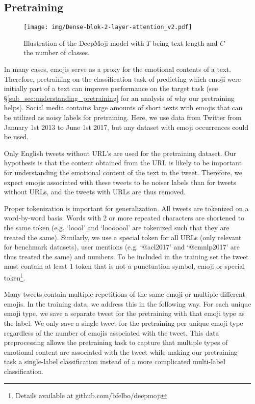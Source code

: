 \documentclass[11pt,a4paper]{article}
\begin{document}
\subsection{Pretraining}
\label{sub_sec:pretraining}

\begin{figure}[tp]
  \centering
  \texttt{[image: img/Dense-blok-2-layer-attention\_v2.pdf]}
  \caption{Illustration of the DeepMoji model with $T$ being text length and $C$ the number of classes.}
  \label{fig:lstm}
\end{figure}

In many cases, emojis serve as a proxy for the emotional contents of a text. Therefore, pretraining on the classification task of predicting which emoji were initially part of a text can improve performance on the target task (see \S\ref{sub_sec:understanding_pretraining} for an analysis of why our pretraining helps). Social media contains large amounts of short texts with emojis that can be utilized as noisy labels for pretraining. Here, we use data from Twitter from January 1st 2013 to June 1st 2017, but any dataset with emoji occurrences could be used.

Only English tweets without URL's are used for the pretraining dataset. Our hypothesis is that the content obtained from the URL is likely to be important for understanding the emotional content of the text in the tweet. Therefore, we expect emojis associated with these tweets to be noiser labels than for tweets without URLs, and the tweets with URLs are thus removed.

Proper tokenization is important for generalization. All tweets are tokenized on a word-by-word basis. Words with 2 or more repeated characters are shortened to the same token (e.g. `loool' and `looooool' are tokenized such that they are treated the same). Similarly, we use a special token for all URLs (only relevant for benchmark datasets), user mentions (e.g. `@acl2017' and `@emnlp2017' are thus treated the same) and numbers. To be included in the training set the tweet must contain at least 1 token that is not a punctuation symbol, emoji or special token\footnote{Details available at github.com/bfelbo/deepmoji}.

Many tweets contain multiple repetitions of the same emoji or multiple different emojis. In the training data, we address this in the following way. For each unique emoji type, we save a separate tweet for the pretraining with that emoji type as the label. We only save a single tweet for the pretraining per unique emoji type regardless of the number of emojis associated with the tweet. This data preprocessing allows the pretraining task to capture that multiple types of emotional content are associated with the tweet while making our pretraining task a single-label classification instead of a more complicated multi-label classification.
\end{document}
